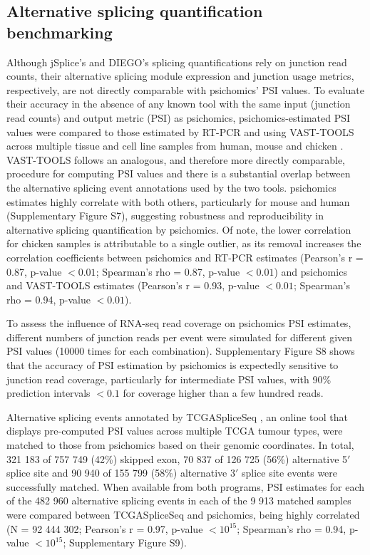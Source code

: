 \subsection{Alternative splicing quantification benchmarking}

Although jSplice's \cite{christinat:2016ui} and DIEGO’s \cite{doose:2018uv} splicing quantifications rely on junction read counts, their alternative splicing module expression and junction usage metrics, respectively, are not directly comparable with psichomics’ PSI values. To evaluate their accuracy in the absence of any known tool with the same input (junction read counts) and output metric (PSI) as psichomics, psichomics-estimated PSI values were compared to those estimated by RT-PCR and using VAST-TOOLS \cite{irimia:2014wt} across multiple tissue and cell line samples from human, mouse and chicken \cite{tapial:2017ui}. VAST-TOOLS follows an analogous, and therefore more directly comparable, procedure for computing PSI values and there is a substantial overlap between the alternative splicing event annotations used by the two tools. psichomics estimates highly correlate with both others, particularly for mouse and human (Supplementary Figure S7), suggesting robustness and reproducibility in alternative splicing quantification by psichomics. Of note, the lower correlation for chicken samples is attributable to a single outlier, as its removal increases the correlation coefficients between psichomics and RT-PCR estimates (Pearson's r = 0.87, p-value $< 0.01$; Spearman's rho = 0.87, p-value $< 0.01$) and psichomics and VAST-TOOLS estimates (Pearson's r = 0.93, p-value $< 0.01$; Spearman's rho = 0.94, p-value $< 0.01$).

To assess the influence of RNA-seq read coverage on psichomics PSI estimates, different numbers of junction reads per event were simulated for different given PSI values (10000 times for each combination). Supplementary Figure S8 shows that the accuracy of PSI estimation by psichomics is expectedly sensitive to junction read coverage, particularly for intermediate PSI values, with 90\% prediction intervals $<0.1$ for coverage higher than a few hundred reads.

Alternative splicing events annotated by TCGASpliceSeq \cite{ryan:2016tm}, an online tool that displays pre-computed PSI values across multiple TCGA tumour types, were matched to those from psichomics based on their genomic coordinates. In total, 321 183 of 757 749 (42\%) skipped exon, 70 837 of 126 725 (56\%) alternative 5$'$ splice site and 90 940 of 155 799 (58\%) alternative 3$'$ splice site events were successfully matched. When available from both programs, PSI estimates for each of the 482 960 alternative splicing events in each of the 9 913 matched samples were compared between TCGASpliceSeq and psichomics, being highly correlated (N = 92 444 302; Pearson's r = 0.97, p-value $< 10^{15}$; Spearman's rho = 0.94, p-value $< 10^{15}$; Supplementary Figure S9).

